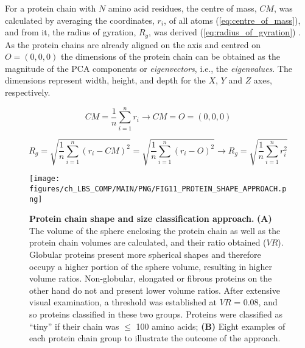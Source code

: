 For a protein chain with $N$ amino acid residues, the centre of mass, $CM$, was calculated by averaging the coordinates, $r_{i}$, of all atoms (\autoref{eq:centre_of_mass}), and from it, the radius of gyration, $R_{g}$, was derived (\autoref{eq:radius_of_gyration}) \cite{FIXMAN_1962_ROG}. As the protein chains are already aligned on the axis and centred on $O = (0, 0, 0)$ the dimensions of the protein chain can be obtained as the magnitude of the PCA components or \textit{eigenvectors}, i.e., the \textit{eigenvalues}. The dimensions represent width, height, and depth for the $X$, $Y$ and $Z$ axes, respectively.

\begin{equation}
CM = \frac{1}{n} \sum_{i=1}^{n} r_i \rightarrow CM = O = (0,0,0)
\label{eq:centre_of_mass}
\end{equation}

\begin{equation}
R_g = \sqrt{\frac{1}{n} \sum_{i=1}^{n} (r_i - CM)^2} = \sqrt{\frac{1}{n} \sum_{i=1}^{n} (r_i - O)^2} \rightarrow R_g = \sqrt{\frac{1}{n} \sum_{i=1}^{n} r_i^2}
\label{eq:radius_of_gyration}
\end{equation}

\begin{figure}[htb!]
    \centering
    \texttt{[image: figures/ch\_LBS\_COMP/MAIN/PNG/FIG11\_PROTEIN\_SHAPE\_APPROACH.png]}
    \caption[Protein chain shape and size classification approach]{\textbf{Protein chain shape and size classification approach.} \textbf{(A)} The volume of the sphere enclosing the protein chain as well as the protein chain volumes are calculated, and their ratio obtained ($VR$). Globular proteins present more spherical shapes and therefore occupy a higher portion of the sphere volume, resulting in higher volume ratios. Non-globular, elongated or fibrous proteins on the other hand do not and present lower volume ratios. After extensive visual examination, a threshold was established at $VR$ = 0.08, and so proteins classified in these two groups. Proteins were classified as ``tiny'' if their chain was $\leq$ 100 amino acids; \textbf{(B)} Eight examples of each protein chain group to illustrate the outcome of the approach.}
    \label{fig:protein_class_approach}
\end{figure}

